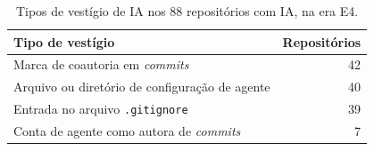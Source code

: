 \begin{table}[htbp]
\centering\footnotesize
\caption{Tipos de vestígio de IA nos 88 repositórios com IA, na era E4.}
\label{tab:sinais_ia}
\begin{tabular}{lr}
\hline
\textbf{Tipo de vestígio} & \textbf{Repositórios} \\ \hline
Marca de coautoria em \emph{commits} & 42 \\
Arquivo ou diretório de configuração de agente & 40 \\
Entrada no arquivo \texttt{.gitignore} & 39 \\
Conta de agente como autora de \emph{commits} & 7 \\
\hline
\end{tabular}
\par{}
\end{table}
